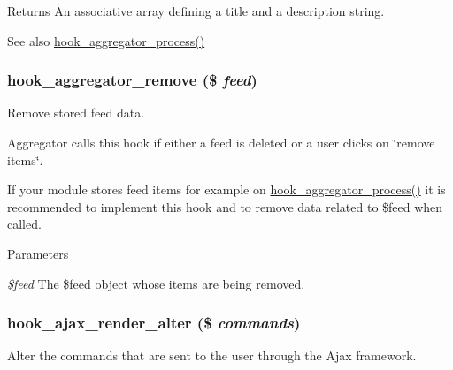 \begin{DoxyReturn}{Returns}
An associative array defining a title and a description string.
\end{DoxyReturn}
\begin{DoxySeeAlso}{See also}
\hyperlink{group__hooks_gaf5da0f420ab3b27c1bc33f339c979ac7}{hook\_\-aggregator\_\-process()} 
\end{DoxySeeAlso}
\hypertarget{group__hooks_gaf2f3e401371efb540b050208df5400eb}{
\subsubsection[{hook\_\-aggregator\_\-remove}]{\setlength{\rightskip}{0pt plus 5cm}hook\_\-aggregator\_\-remove (\$ {\em feed})}}
\label{group__hooks_gaf2f3e401371efb540b050208df5400eb}
Remove stored feed data.

Aggregator calls this hook if either a feed is deleted or a user clicks on \char`\"{}remove items\char`\"{}.

If your module stores feed items for example on \hyperlink{group__hooks_gaf5da0f420ab3b27c1bc33f339c979ac7}{hook\_\-aggregator\_\-process()} it is recommended to implement this hook and to remove data related to \$feed when called.


\begin{DoxyParams}{Parameters}
\item[{\em \$feed}]The \$feed object whose items are being removed. \end{DoxyParams}
\hypertarget{group__hooks_ga52f3fed51f62747155cfd2b373de4ec6}{
\subsubsection[{hook\_\-ajax\_\-render\_\-alter}]{\setlength{\rightskip}{0pt plus 5cm}hook\_\-ajax\_\-render\_\-alter (\$ {\em commands})}}
\label{group__hooks_ga52f3fed51f62747155cfd2b373de4ec6}
Alter the commands that are sent to the user through the Ajax framework.


